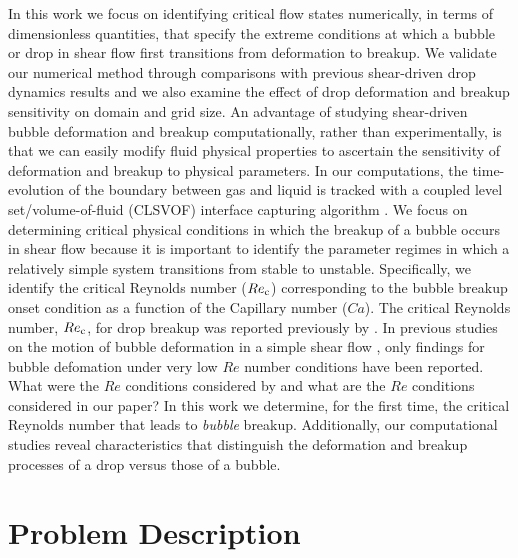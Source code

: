\documentclass[%
 reprint,
 showkeys,
 amsmath,amssymb,
 aps,
 prfluids,
 onecolumn
]{revtex4-2}
\begin{document}
In this work we focus on identifying critical flow states numerically, in terms
of dimensionless quantities, that specify the extreme conditions at which a
bubble or drop in shear flow first transitions from deformation to breakup.
We validate our numerical method through comparisons with previous
shear-driven drop dynamics results and we also examine the effect of drop
deformation and breakup sensitivity on domain and grid size.  An advantage of
studying shear-driven bubble deformation and breakup computationally, rather
than experimentally, is that we can easily modify fluid physical properties to
ascertain the sensitivity of deformation and breakup to physical parameters.
In our computations, the time-evolution of the boundary between gas and liquid
is tracked with a coupled level set/volume-of-fluid (CLSVOF) interface
capturing algorithm \cite{SusPuc00,SUSSMAN2007469}.  
We focus on determining critical physical
conditions in which the breakup of a bubble occurs in shear flow because it is
important to identify the parameter regimes in which a relatively simple system
transitions from stable to unstable.  Specifically, we identify the critical
Reynolds number ($Re_{\rm c}$) corresponding to the bubble breakup onset condition as
a function of the Capillary number ($Ca$). 
The critical Reynolds number, $Re_{\rm c}$, for drop breakup was 
reported previously by \cite{LiRenRen00}.
{\color{red} In previous studies on the motion of bubble deformation
in a simple shear flow \cite{RusMan02, MulTobDreFisWin08}, 
only findings for bubble defomation under very low $Re$ 
number conditions have been reported.}
{\color{blue} What were the $Re$ conditions considered by 
\cite{RusMan02, MulTobDreFisWin08} and what are the $Re$ conditions 
considered in our paper?}
In this work we determine, for the first time, the critical Reynolds number that leads to \emph{bubble}
breakup.  Additionally, our computational studies reveal characteristics that
distinguish the deformation and breakup processes of a drop versus those of a bubble.

\section{Problem Description}
\end{document}
